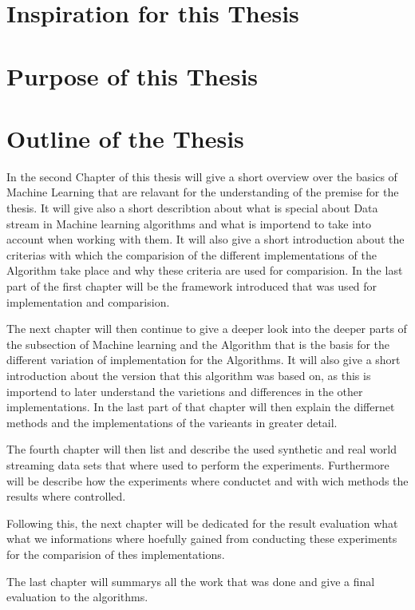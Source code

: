\documentclass[12pt,oneside,a4paper,parskip]{scrbook}
\begin{document}
\section{Inspiration for this Thesis} 

\section{Purpose of this Thesis} 

\section{Outline of the Thesis} 

In the second Chapter of this thesis will give a short overview over the basics of Machine Learning that are relavant for
the understanding of the premise for the thesis. It will give also a short describtion about what is special about Data stream 
in Machine learning algorithms and what is importend to take into account when working with them.
It will also give a short introduction about the criterias with which the comparision of the different implementations 
of the Algorithm take place and why these criteria are used for  comparision.
In the last part of the first chapter will be the framework introduced that was used for implementation and comparision.

The next chapter will then continue to give a deeper look into the deeper parts of the subsection of Machine learning 
and the Algorithm that is the basis for the different variation of implementation for the Algorithms.
It will also give a short introduction about the version that this algorithm was based on, as this is importend to later understand
the varietions and differences in the other implementations.
In the last part of that chapter will then explain the differnet methods and the implementations of the varieants in greater detail.

The fourth chapter will then list and describe the used synthetic and real world streaming data sets that where used to 
perform the experiments.
Furthermore will be describe how the experiments where conductet and with wich methods the results where controlled.

Following this, the next chapter will be dedicated for the result evaluation what what we informations where hoefully gained
from conducting these experiments for the comparision of thes implementations.

The last chapter will summarys all the work that was done and give a final evaluation to the algorithms.
\end{document}
